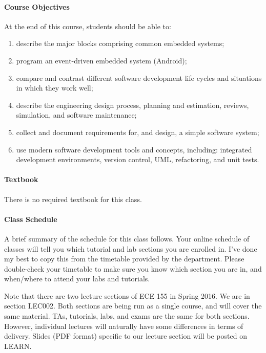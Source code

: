 \documentclass[letterpaper,10pt]{article}
\begin{document}
\paragraph{Course Objectives} At the end of this course, students should be able to:
\begin{enumerate}
\itemsep0em
        \item describe the major blocks comprising common embedded systems;
        \item program an event-driven embedded system (Android);
        \item compare and contrast different software development life cycles and situations in which they work well;
        \item describe the engineering design process, planning and estimation, reviews, simulation, and software maintenance;
        \item collect and document requirements for, and design, a simple software system;
        \item use modern software development tools and concepts, including: integrated development environments, version control, UML, refactoring, and unit tests.
\end{enumerate}

\paragraph{Textbook} There is no required textbook for this class.

\paragraph{Class Schedule}

A brief summary of the schedule for this class follows. Your online schedule of classes will tell you which tutorial and lab sections you are enrolled in. I've done my best to copy this from the timetable provided by the department. Please double-check your timetable to make sure you know which section you are in, and when/where to attend your labs and tutorials.

Note that there are two lecture sections of ECE 155 in Spring 2016. We are in section LEC002. Both sections are being run as a single course, and will cover the same material. TAs, tutorials, labs, and exams are the same for both sections. However, individual lectures will naturally have some differences in terms of delivery. Slides (PDF format) specific to our lecture section will be posted on LEARN.
\end{document}

